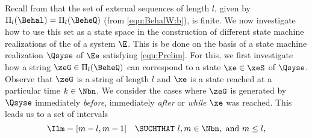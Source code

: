 Recall from  that the set of external sequences of length $l$, given by $\Pi_l(\Behal)=\Pi_l(\BeheQ)$ (from \eqref{equ:BehalW:b}), is finite. We now investigate how to use this set as a state space in the construction of different state machine realizations of the \SAlA of a system $\E$. This is be done on the basis of a state machine realization $\Qsyse$ of $\Ee$ satisfying \eqref{equ:Prelim}. For this,
we first investigate how a string $\zeG\in\Pi_l(\BeheQ)$ can correspond to a state $\xe\in\xeS$ of $\Qsyse$. Observe that $\zeG$ is a string of length $l$ and $\xe$ is a state reached at a particular time $k\in\Nbn$. We consider the cases where $\zeG$ is generated by $\Qsyse$ immediately \emph{before}, immediately \emph{after} or \emph{while} $\xe$ was reached. This leads us to a set of intervals 
\begin{equation}\label{equ:Prelim:I}
 \Ilm=[m-l,m-1]\quad\SUCHTHAT~ l,m\in\Nbn,~\text{and}~m\leq l,
\end{equation}


